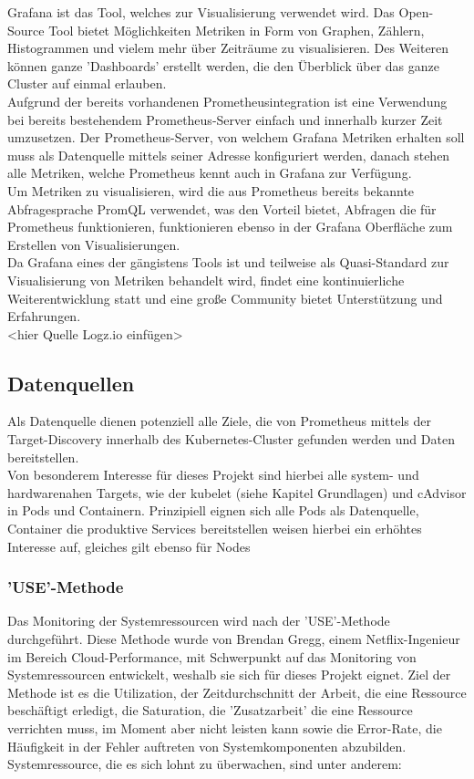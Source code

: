 \documentclass[a4paper,10pt]{scrartcl}
\begin{document}
Grafana ist das Tool, welches zur Visualisierung verwendet wird. Das Open-Source Tool bietet Möglichkeiten Metriken in Form von Graphen, Zählern, Histogrammen und vielem mehr über Zeiträume zu visualisieren. Des Weiteren können ganze 'Dashboards' erstellt werden, die den Überblick über das ganze Cluster auf einmal erlauben.\\
Aufgrund der bereits vorhandenen Prometheusintegration ist eine Verwendung bei bereits bestehendem Prometheus-Server einfach und innerhalb kurzer Zeit umzusetzen.
Der Prometheus-Server, von welchem Grafana Metriken erhalten soll muss als Datenquelle mittels seiner Adresse konfiguriert werden, danach stehen alle Metriken, welche Prometheus kennt auch in Grafana zur Verfügung.\\
Um Metriken zu visualisieren, wird die aus Prometheus bereits bekannte Abfragesprache PromQL verwendet, was den Vorteil bietet, Abfragen die für Prometheus funktionieren, funktionieren ebenso in der Grafana Oberfläche zum Erstellen von Visualisierungen.\\
Da Grafana eines der gängistens Tools ist und teilweise als Quasi-Standard zur Visualisierung von Metriken behandelt wird, findet eine kontinuierliche Weiterentwicklung statt und eine große Community bietet Unterstützung und Erfahrungen.\\<hier Quelle Logz.io einfügen>

\subsection{Datenquellen}

Als Datenquelle dienen potenziell alle Ziele, die von Prometheus mittels der Target-Discovery innerhalb des Kubernetes-Cluster gefunden werden und Daten bereitstellen.\\
Von besonderem Interesse für dieses Projekt sind hierbei alle system- und hardwarenahen Targets, wie der kubelet (siehe Kapitel Grundlagen) und cAdvisor in Pods und Containern.
Prinzipiell eignen sich alle Pods als Datenquelle, Container die produktive Services bereitstellen weisen hierbei ein erhöhtes Interesse auf, gleiches gilt ebenso für Nodes

\subsubsection{'USE'-Methode}

Das Monitoring der Systemressourcen wird nach der 'USE'-Methode durchgeführt. Diese Methode wurde von Brendan Gregg, einem Netflix-Ingenieur im Bereich Cloud-Performance, mit Schwerpunkt auf das Monitoring von Systemressourcen entwickelt, weshalb sie sich für dieses Projekt eignet.
Ziel der Methode ist es die Utilization, der Zeitdurchschnitt der Arbeit, die eine Ressource beschäftigt erledigt, die Saturation, die 'Zusatzarbeit' die eine Ressource verrichten muss, im Moment aber nicht leisten kann sowie die Error-Rate, die Häufigkeit in der Fehler auftreten von Systemkomponenten abzubilden.\\
Systemressource, die es sich lohnt zu überwachen, sind unter anderem:\\
\end{document}
